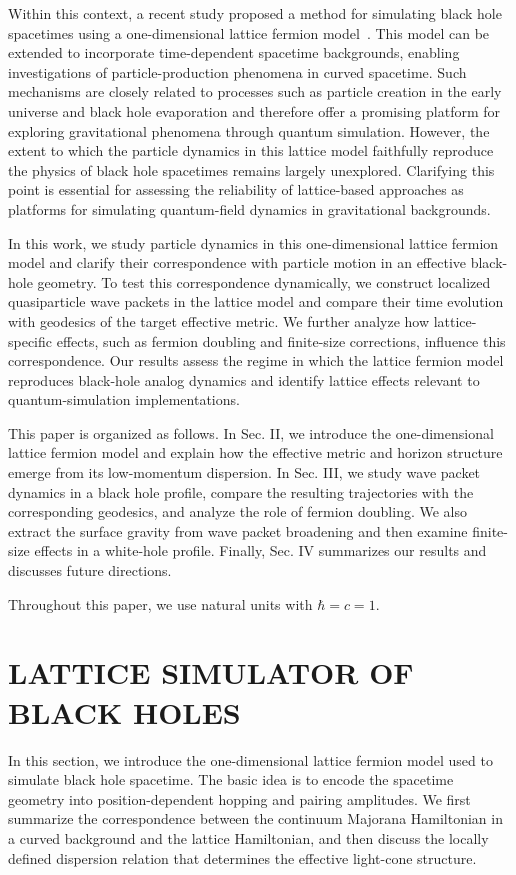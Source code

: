 \documentclass[reprint,amsmath,amssymb,aps,prb]{revtex4-2}
\begin{document}
Within this context, a recent study proposed a method for simulating black hole spacetimes using a one-dimensional lattice fermion model~\cite{PhysRevResearch.7.023197}. This model can be extended to incorporate time-dependent spacetime backgrounds, enabling investigations of particle-production phenomena in curved spacetime. Such mechanisms are closely related to processes such as particle creation in the early universe and black hole evaporation and therefore offer a promising platform for exploring gravitational phenomena through quantum simulation. However, the extent to which the particle dynamics in this lattice model faithfully reproduce the physics of black hole spacetimes remains largely unexplored. Clarifying this point is essential for assessing the reliability of lattice-based approaches as platforms for simulating quantum-field dynamics in gravitational backgrounds.

In this work, we study particle dynamics in this one-dimensional lattice fermion model and clarify their correspondence with particle motion in an effective black-hole geometry.
To test this correspondence dynamically, we construct localized
quasiparticle wave packets in the lattice model and compare their
time evolution with geodesics of the target effective metric.
We further analyze how lattice-specific effects, such as fermion doubling and finite-size corrections, influence this correspondence.
Our results assess the regime in which the lattice fermion model reproduces black-hole analog dynamics and identify lattice effects relevant to quantum-simulation implementations.

This paper is organized as follows. In Sec. II, we introduce the one-dimensional lattice fermion model and explain how the effective metric and horizon structure emerge from its low-momentum dispersion. In Sec. III, we study wave packet dynamics in a black hole profile, compare the resulting trajectories with the corresponding geodesics, and analyze the role of fermion doubling. We also extract the surface gravity from wave packet broadening and then examine finite-size effects in a white-hole profile. Finally, Sec. IV summarizes our results and discusses future directions.

Throughout this paper, we use natural units with $\hbar=c=1$.

\section{LATTICE SIMULATOR OF
BLACK HOLES}
In this section, we introduce the one-dimensional lattice fermion model used to simulate black hole spacetime.
The basic idea is to encode the spacetime geometry into position-dependent hopping and pairing amplitudes.
We first summarize the correspondence between the continuum Majorana Hamiltonian in a curved background and the lattice Hamiltonian, and then discuss the locally defined dispersion relation that determines the effective light-cone structure.
\end{document}
